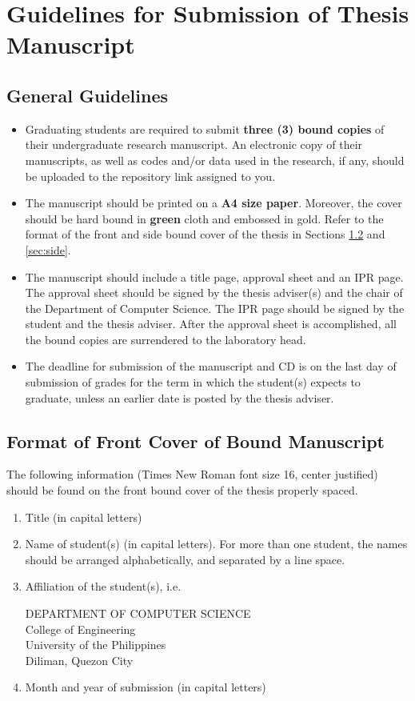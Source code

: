 \chapter{Guidelines for Submission of Thesis Manuscript}
\label{cha:submission}

\section{General Guidelines}

\begin{itemize}
\item Graduating students are required to submit \textbf{three (3) bound copies} of their undergraduate research manuscript. An electronic copy of their manuscripts, as well as codes and/or data used in the research, if any, should be uploaded to the repository link assigned to you.
\item The manuscript should be printed on a \textbf{A4 size paper}. Moreover, the cover should be hard bound in \textbf{green} cloth and embossed in gold. Refer to the format of the front and side bound cover of the thesis in Sections \ref{sec:front} and \ref{sec:side}.
\item The manuscript should include a title page, approval sheet and an IPR page. The approval sheet should be signed by the thesis adviser(s) and the chair of the Department of Computer Science. The IPR page should be signed by the student and the thesis adviser.  After the approval sheet is accomplished, all the bound copies are surrendered to the laboratory head.
\item The deadline for submission of the manuscript and CD is on the last day of submission of grades for the term in which the student(s) expects to graduate, unless an earlier date is posted by the thesis adviser.
\end{itemize}

\section{Format of Front Cover of Bound Manuscript}
\label{sec:front}
The following information (Times New Roman font size 16, center justified) should be found on the front bound cover of
the thesis properly spaced.
\begin{enumerate}
\item Title (in capital letters)
\item Name of student(s) (in capital letters). For more than one student, the names should be arranged alphabetically, and separated by a line space.
\item Affiliation of the student(s), i.e.
{\ssp\begin{center}
DEPARTMENT OF COMPUTER SCIENCE\\
College of Engineering\\
University of the Philippines\\
Diliman, Quezon City
\end{center}}
\item Month and year of submission (in capital letters)
\end{enumerate}


